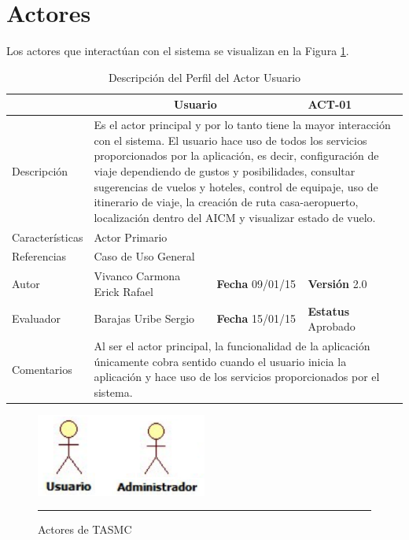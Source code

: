 \section{Actores}

Los actores que interactúan con el sistema se visualizan en la Figura \ref{fig:actoresTASMC}.

\begin{table}[htbp]
	\begin{center}
		\begin{tabular}{|p{2.5cm}|p{6.4cm}|p{2cm}|p{2cm}|}
			\hline
				\rowcolor[RGB]{255,102,102}{Actor}&\multicolumn{2}{c}{Usuario}&{\textbf{ACT-01}}\\
			\hline
				{Descripción}&\multicolumn{3}{p{11.2cm}|}{
			Es el actor principal y por lo tanto tiene la mayor interacción con el sistema. El usuario hace uso de todos 				los servicios proporcionados por la aplicación, es decir, configuración de viaje dependiendo de gustos y 					posibilidades, consultar sugerencias de vuelos y hoteles, control de equipaje, uso de itinerario de viaje, la 				creación de ruta casa-aeropuerto, localización dentro del AICM y visualizar estado de vuelo.}\\
			\hline
				{Características}&\multicolumn{3}{p{11.2cm}|}{Actor Primario}\\
			\hline
				{Referencias}&\multicolumn{3}{p{11.2cm}|}{Caso de Uso General}\\
			\hline
				{Autor}&{Vivanco Carmona Erick Rafael}&{\textbf{Fecha} 09/01/15}&{\textbf{Versión} 2.0}\\
			\hline
				{Evaluador}&{Barajas Uribe Sergio}&{\textbf{Fecha} 15/01/15}&{\textbf{Estatus} Aprobado}\\
			\hline
				{Comentarios}&\multicolumn{3}{p{11.2cm}|}{Al ser el actor principal, la funcionalidad de la aplicación 						únicamente cobra sentido cuando el usuario inicia la aplicación y hace uso de los servicios 										proporcionados por el sistema.}\\
			\hline
		\end{tabular}
	\end{center}
	\caption[Descripción del Perfil del Actor Usuario]{Descripción del Perfil del Actor Usuario}
    	\label{tab:perfilUsuario}
\end{table}

\begin{figure}[htbp]
	\centering
		\includegraphics[width=0.5\textwidth]{Figuras/actores.png}
		\rule{30em}{0.5pt}
	\caption[Actores de TASMC]{Actores de TASMC}
	\label{fig:actoresTASMC}
\end{figure}

